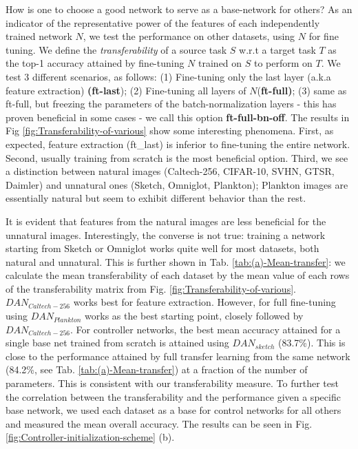 \documentclass[10pt,journal,compsoc]{IEEEtran}
\begin{document}
How is one to choose a good network to serve as a base-network for
others? As an indicator of the representative power of the features
of each independently trained network $N$, we test the performance
on other datasets, using $N$ for fine tuning. We define the \emph{transferability}
of a source task $S$ w.r.t a target task $T$ as the top-1 accuracy
attained by fine-tuning $N$ trained on $S$ to perform on $T$. We
test 3 different scenarios, as follows: (1)\textbf{ }Fine-tuning only
the last layer (a.k.a feature extraction) \textbf{(ft-last}); (2)
Fine-tuning all layers of $N$(\textbf{ft-full)}; (3) same as ft-full,
but freezing the parameters of the batch-normalization layers - this
has proven beneficial in some cases - we call this option \textbf{ft-full-bn-off}.
The results in Fig \ref{fig:Transferability-of-various} show some
interesting phenomena. First, as expected, feature extraction (ft\_last)
is inferior to fine-tuning the entire network. Second, usually training
from scratch is the most beneficial option. Third, we see a distinction
between natural images (Caltech-256, CIFAR-10, SVHN, GTSR, Daimler)
and unnatural ones (Sketch, Omniglot, Plankton); Plankton images are
essentially natural but seem to exhibit different behavior than the
rest. 

It is evident that features from the natural images are less beneficial
for the unnatural images. Interestingly, the converse is not true:
training a network starting from Sketch\emph{ }or Omniglot\emph{ }works
quite well for most datasets, both natural and unnatural. This is
further shown in Tab. \ref{tab:(a)-Mean-transfer}: we calculate the
mean transferability of each dataset by the mean value of each rows
of the transferability matrix from Fig. \ref{fig:Transferability-of-various}.
$DAN_{Caltech-256}$ works best for feature extraction. However, for
full fine-tuning using $DAN_{Plankton}$ works as the best starting
point, closely followed by $DAN_{Caltech-256}$. For controller networks,
the best mean accuracy attained for a single base net trained from
scratch is attained using $DAN_{sketch}$ (83.7\%). This is close
to the performance attained by full transfer learning from the same
network (84.2\%, see Tab. \ref{tab:(a)-Mean-transfer}) at a fraction
of the number of parameters. This is consistent with our transferability
measure. To further test the correlation between the transferability
and the performance given a specific base network, we used each dataset
as a base for control networks for all others and measured the mean
overall accuracy. The results can be seen in Fig. \ref{fig:Controller-initialization-scheme}
(b). 
\end{document}
